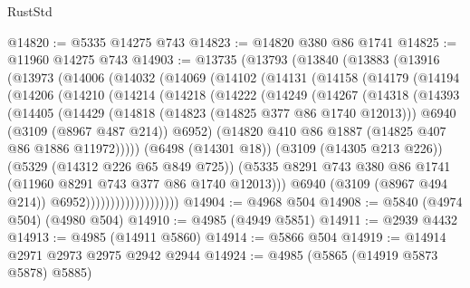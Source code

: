 \begin{lexlean}{RustStd}
\begin{coremodule}
@14820 := @5335 @14275 @743
@14823 := @14820 @380 @86 @1741
@14825 := @11960 @14275 @743
@14903 := @13735
    (@13793
      (@13840
        (@13883
          (@13916
            (@13973
              (@14006
                (@14032
                  (@14069
                    (@14102
                      (@14131
                        (@14158
                          (@14179
                            (@14194
                              (@14206
                                (@14210
                                  (@14214
                                    (@14218
                                      (@14222
                                        (@14249
                                          (@14267
                                            (@14318
                                              (@14393
                                                (@14405
                                                  (@14429
                                                    (@14818 (@14823 (@14825 @377 @86 @1740 @12013)))
                                                    @6940
                                                    (@3109 (@8967 @487 @214))
                                                    @6952)
                                                  (@14820
                                                    @410
                                                    @86
                                                    @1887
                                                    (@14825 @407 @86 @1886 @11972)))))
                                            (@6498 (@14301 @18))
                                            (@3109 (@14305 @213 @226))
                                            (@5329 (@14312 @226 @65 @849 @725))
                                            (@5335
                                              @8291
                                              @743
                                              @380
                                              @86
                                              @1741
                                              (@11960 @8291 @743 @377 @86 @1740 @12013)))
                                          @6940
                                          (@3109 (@8967 @494 @214))
                                          @6952)))))))))))))))))))
@14904 := @4968 @504
@14908 := @5840 (@4974 @504) (@4980 @504)
@14910 := @4985 (@4949 @5851)
@14911 := @2939 @4432
@14913 := @4985 (@14911 @5860)
@14914 := @5866 @504
@14919 := @14914 @2971 @2973 @2975 @2942 @2944
@14924 := @4985 (@5865 (@14919 @5873 @5878) @5885)

\end{coremodule}
\end{lexlean}
